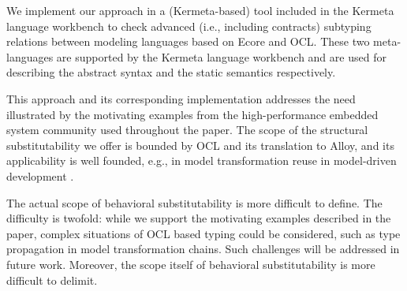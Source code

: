 We implement our approach in a (Kermeta-based) tool included in the Kermeta language workbench to check advanced (i.e., including contracts) subtyping relations between modeling languages based on Ecore and OCL. These two meta-languages are supported by the Kermeta language workbench and are used for describing the abstract syntax and the static semantics respectively. 

This approach and its corresponding implementation addresses the need illustrated by the motivating examples from the high-performance embedded system community used throughout the paper. The scope of the structural substitutability we offer is bounded by OCL and its translation to Alloy, and its applicability is well founded, e.g., in model transformation reuse in model-driven development \cite{ecmfa12}.

The actual scope of behavioral substitutability is more difficult to define. The difficulty is twofold: while we support the motivating examples described in the paper, complex situations of OCL based typing could be considered, such as type propagation in model transformation chains. Such challenges will be addressed in future work. %
Moreover, the scope itself of behavioral substitutability is more difficult to delimit. 

